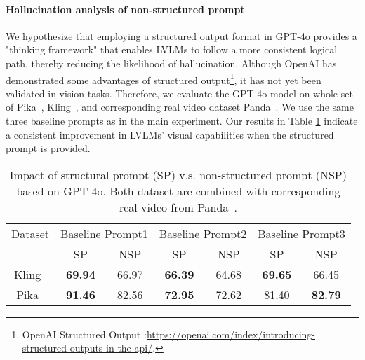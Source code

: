 \paragraph{Hallucination analysis of non-structured prompt}
We hypothesize that employing a structured output format in GPT-4o provides a "thinking framework" that enables LVLMs to follow a more consistent logical path, thereby reducing the likelihood of hallucination. 
Although OpenAI has demonstrated some advantages of structured output\footnote{OpenAI Structured Output :\url{https://openai.com/index/introducing-structured-outputs-in-the-api/}.}, it has not yet been validated in vision tasks. 
Therefore, we evaluate the GPT-4o model on whole set of Pika~\cite{pika}, Kling~\cite{klingai}, and corresponding real video dataset Panda~\cite{chen2024panda70mcaptioning70mvideos}. We use the same three baseline prompts as in the main experiment. Our results in Table \ref{tab:ablation_impact_of_structured} indicate a consistent improvement in LVLMs' visual capabilities when the structured prompt is provided.


\begin{table}[t!]
\centering
\scriptsize
\begin{tabular}{@{}c|cc|cc|cc@{}}
\hline
Dataset & \multicolumn{2}{c|}{Baseline Prompt1} & \multicolumn{2}{c|}{Baseline Prompt2} & \multicolumn{2}{c}{Baseline Prompt3} \\ \cline{2-7}
                         & SP       & NSP     & SP       & NSP      & SP       & NSP      \\ \hline
Kling~\cite{klingai}               & \textbf{69.94} & 66.97              & \textbf{66.39} & 64.68              & \textbf{69.65} & 66.45              \\
Pika~\cite{pika}               & \textbf{91.46} & 82.56             & \textbf{72.95} & 72.62              & 81.40 & \textbf{82.79}             \\
\hline

\end{tabular}
    \vspace{-1mm}
\caption{Impact of structural prompt (SP) v.s. non-structured prompt (NSP) based on GPT-4o. Both dataset are combined with corresponding real video from Panda~\cite{chen2024panda70mcaptioning70mvideos}.}
\label{tab:ablation_impact_of_structured}
    \vspace{-2mm}
\end{table}


